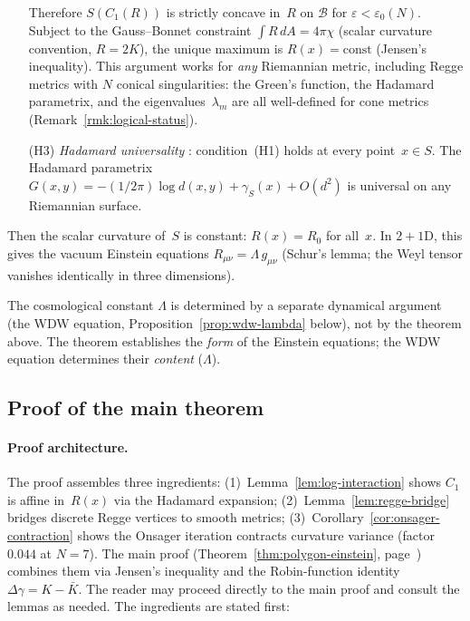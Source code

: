 \begin{theorem}
\begin{enumerate}
  Therefore $S(C_1(R))$ is strictly concave in~$R$ on
  $\mathcal{B}$ for $\varepsilon < \varepsilon_0(N)$.
  Subject to the Gauss--Bonnet constraint
  $\int R\,dA = 4\pi\chi$ (scalar curvature convention,
  $R = 2K$),
  the unique maximum is $R(x) = \mathrm{const}$
  (Jensen's inequality).
  This argument works for \emph{any} Riemannian metric,
  including Regge metrics with $N$ conical singularities:
  the Green's function, the Hadamard parametrix, and the
  eigenvalues~$\lambda_m$ are all well-defined for cone
  metrics (Remark~\ref{rmk:logical-status}).
\item[\textup{(H3)}]
  \emph{Hadamard universality} :
  condition~\textup{(H1)} holds
  at every point~$x \in S$.
  The Hadamard parametrix
  $G(x,y) = -(1/2\pi)\log d(x,y) + \gamma_S(x) + O(d^2)$
  is universal on any Riemannian surface.
\end{enumerate}
Then the scalar curvature of~$S$ is constant:
$R(x) = R_0$ for all~$x$.
In $2{+}1$D, this gives the vacuum Einstein equations
$R_{\mu\nu} = \Lambda\,g_{\mu\nu}$ (Schur's lemma;
the Weyl tensor vanishes identically in three dimensions).
\end{theorem}

\noindent
The cosmological constant $\Lambda$ is determined by a
separate dynamical argument (the WDW equation,
Proposition~\ref{prop:wdw-lambda} below), not by
the theorem above.
The theorem establishes the \emph{form} of the Einstein
equations; the WDW equation determines their
\emph{content} ($\Lambda$).

\subsection{Proof of the main theorem}

\paragraph{Proof architecture.}
The proof assembles three ingredients:
(1)~Lemma~\ref{lem:log-interaction} shows $C_1$ is
affine in~$R(x)$ via the Hadamard expansion;
(2)~Lemma~\ref{lem:regge-bridge} bridges discrete
Regge vertices to smooth metrics;
(3)~Corollary~\ref{cor:onsager-contraction} shows the
Onsager iteration contracts curvature variance
(factor~$0.044$ at $N = 7$).
The main proof (Theorem~\ref{thm:polygon-einstein},
page~\pageref{thm:polygon-einstein}) combines them via
Jensen's inequality and the Robin-function identity
$\Delta\gamma = K - \bar{K}$.
The reader may proceed directly to the main proof
and consult the lemmas as needed.
The ingredients are stated first:

